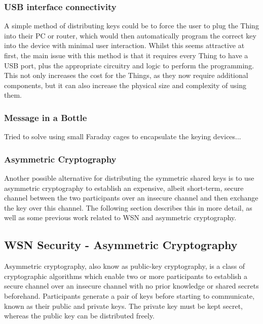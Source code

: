 \documentclass{mprop}
\begin{document}
\subsubsection{USB interface connectivity} %
\label{ssub:usb_interface_connectivity}
A simple method of distributing keys could be to force the user to plug the Thing into their PC or router, which would then automatically program the correct key into the device with minimal user interaction. Whilst this seems attractive at first, the main issue with this method is that it requires every Thing to have a USB port, plus the appropriate circuitry and logic to perform the programming. This not only increases the cost for the Things, as they now require additional components, but it can also increase the physical size and complexity of using them.

\subsubsection{Message in a Bottle} %
\label{ssub:message_in_a_bottle}
Tried to solve using small Faraday cages to encapsulate the keying devices...\cite{MessageBottle}
\subsubsection{Asymmetric Cryptography} %
\label{ssub:asymmetric_cryptography}
Another possible alternative for distributing the symmetric shared keys is to use asymmetric cryptography to establish an expensive, albeit short-term, secure channel between the two participants over an insecure channel and then exchange the key over this channel. The following section describes this in more detail, as well as some previous work related to WSN and asymmetric cryptography.

\subsection{WSN Security - Asymmetric Cryptography} %
\label{sub:asymmetric_security}
Asymmetric cryptography, also know as public-key cryptography, is a class of cryptographic algorithms which enable two or more participants to establish a secure channel over an insecure channel with no prior knowledge or shared secrets beforehand. Participants generate a pair of keys before starting to communicate, known as their public and private keys. The private key must be kept secret, whereas the public key can be distributed freely. 
\end{document}

